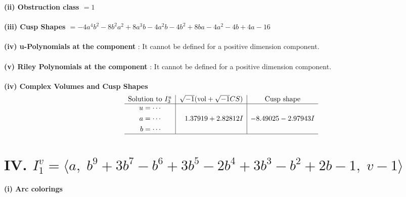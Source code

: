 \documentclass[1p]{elsarticle_modified}
\theoremstyle{definition}
\newcommand{\I}{\sqrt{-1}}
\begin{document}
\flushleft \textbf{(ii) Obstruction class $= 1$}\\~\\
\flushleft \textbf{(iii) Cusp Shapes $= -4 a^4 b^2-8 b^2 a^2+8 a^3 b-4 a^2 b-4 b^2+8 b a-4 a^2-4 b+4 a-16$}\\~\\
\flushleft \textbf{(iv) u-Polynomials at the component} : It cannot be defined for a positive dimension component.\\~\\
\flushleft \textbf{(v) Riley Polynomials at the component} : It cannot be defined for a positive dimension component.\\~\\
\newpage\flushleft \textbf{(iv) Complex Volumes and Cusp Shapes}
$$\begin{array}{c|c|c} 
\text{Solution to }I^u_{3}& \I (\text{vol} + \sqrt{-1}CS) & \text{Cusp shape}\\
 \hline 
\begin{aligned}
u &= \cdots \\
a &= \cdots \\
b &= \cdots\end{aligned}
 & \phantom{-}1.37919 + 2.82812 I & -8.49025 - 2.97943 I\\
 \hline 
 \end{array}
$$\newpage\renewcommand{\arraystretch}{1}
\centering \section*{IV. $I^v_{1}= \langle a,\;b^9+3 b^7- b^6+3 b^5-2 b^4+3 b^3- b^2+2 b-1,\;v-1 \rangle$}
\flushleft \textbf{(i) Arc colorings}\\
\end{document}
